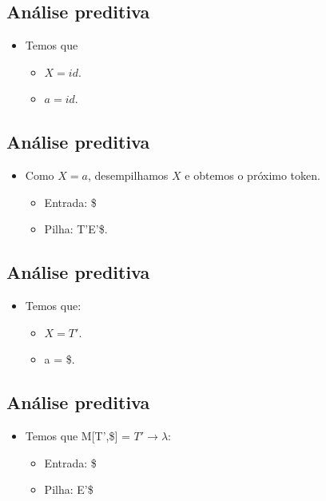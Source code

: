 \documentclass[11pt]{article}
\begin{document}
\subsection*{Análise preditiva}
\label{sec:org6930fa6}

\begin{itemize}
\item Temos que
\begin{itemize}
\item \(X = id\).
\item \(a = id\).
\end{itemize}
\end{itemize}
\subsection*{Análise preditiva}
\label{sec:orga32b94a}

\begin{itemize}
\item Como \(X = a\), desempilhamos \(X\) e obtemos o próximo token.
\begin{itemize}
\item Entrada: \$
\item Pilha: T'E'\$.
\end{itemize}
\end{itemize}
\subsection*{Análise preditiva}
\label{sec:org1486fa9}

\begin{itemize}
\item Temos que:
\begin{itemize}
\item \(X = T'\).
\item a = \$.
\end{itemize}
\end{itemize}
\subsection*{Análise preditiva}
\label{sec:orged92fb8}

\begin{itemize}
\item Temos que M[T',\$] = \(T'\to\lambda\):
\begin{itemize}
\item Entrada: \$
\item Pilha: E'\$
\end{itemize}
\end{itemize}
\end{document}
